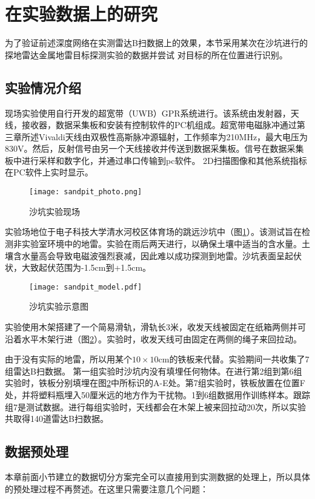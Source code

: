 \section{在实验数据上的研究}
为了验证前述深度网络在实测雷达B扫数据上的效果，本节采用某次在沙坑进行的探地雷达金属地雷目标探测实验的数据并尝试
对目标的所在位置进行识别。
\subsection{实验情况介绍}
现场实验使用自行开发的超宽带（UWB）GPR系统进行。该系统由发射器，天线，接收器，数据采集板和安装有控制软件的PC机组成。超宽带电磁脉冲通过第三章所述Vivaldi天线由双极性高斯脉冲源辐射，工作频率为210MHz，最大电压为830V。然后，反射信号由另一个天线接收并传送到数据采集板。信号在数据采集板中进行采样和数字化，并通过串口传输到pc软件。 2D扫描图像和其他系统指标在PC软件上实时显示。
\begin{figure}[htbp]
	\texttt{[image: sandpit\_photo.png]}
	\caption[]{沙坑实验现场}
	\label{sandpit_photo}
\end{figure}

实验场地位于电子科技大学清水河校区体育场的跳远沙坑中（图\ref{sandpit_photo}）。该测试旨在检测非实验室环境中的地雷。实验在雨后两天进行，以确保土壤中适当的含水量。土壤含水量高会导致电磁波强烈衰减，因此难以成功探测到地雷。沙坑表面呈起伏状，大致起伏范围为-1.5cm到+1.5cm。
\begin{figure}[htbp]
	\texttt{[image: sandpit\_model.pdf]}
	\caption[]{沙坑实验示意图}
	\label{sandpit_model}
\end{figure}

实验使用木架搭建了一个简易滑轨，滑轨长3米，收发天线被固定在纸箱两侧并可沿着水平木架行进（图\ref{sandpit_model}）。实验时，收发天线可由固定在两侧的绳子来回拉动。

由于没有实际的地雷，所以用某个$10\times 10$cm的铁板来代替。实验期间一共收集了7组雷达B扫数据。
第一组实验时沙坑内没有填埋任何物体。在进行第2组到第6组实验时，铁板分别填埋在图\ref{sandpit_model}中所标识的A-E处。第7组实验时，铁板放置在位置F处，并将塑料瓶埋入50厘米远的地方作为干扰物。1到6组数据用作训练样本。跟踪组7是测试数据。进行每组实验时，天线都会在木架上被来回拉动20次，所以实验共取得140道雷达B扫数据。
\subsection{数据预处理}
本章前面小节建立的数据切分方案完全可以直接用到实测数据的处理上，所以具体的预处理过程不再赘述。在这里只需要注意几个问题：

